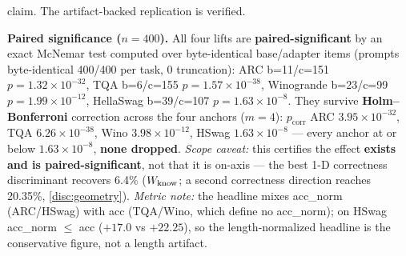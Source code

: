 \begin{table}[tbp]
\begin{threeparttable}
\begin{tablenotes}[flushleft]
claim. The artifact-backed replication is verified.
\item \textbf{Paired significance ($n{=}400$).} All four lifts are
\textbf{paired-significant} by an exact McNemar test computed over byte-identical
base/adapter items (prompts byte-identical 400/400 per task, 0 truncation): ARC
b=11/c=151 $p=1.32\times10^{-32}$, TQA b=6/c=155 $p=1.57\times10^{-38}$, Winogrande
b=23/c=99 $p=1.99\times10^{-12}$, HellaSwag b=39/c=107 $p=1.63\times10^{-8}$. They
survive \textbf{Holm--Bonferroni} correction across the four anchors ($m{=}4$):
$p_{\mathrm{corr}}$ ARC $3.95\times10^{-32}$, TQA $6.26\times10^{-38}$, Wino
$3.98\times10^{-12}$, HSwag $1.63\times10^{-8}$ --- every anchor at or below
$1.63\times10^{-8}$, \textbf{none dropped}. \emph{Scope caveat:} this certifies the
effect \textbf{exists and is paired-significant}, not that it is on-axis --- the best
1-D correctness discriminant recovers 6.4\% ($W_{\mathrm{know}}$; a second correctness direction
reaches 20.35\%, \cref{disc:geometry}). \emph{Metric note:} the
headline mixes acc\_norm (ARC/HSwag) with acc (TQA/Wino, which define no acc\_norm);
on HSwag acc\_norm ${\leq}$ acc ($+17.0$ vs $+22.25$), so the length-normalized
headline is the conservative figure, not a length artifact.
\end{tablenotes}
\end{threeparttable}
\end{table}

